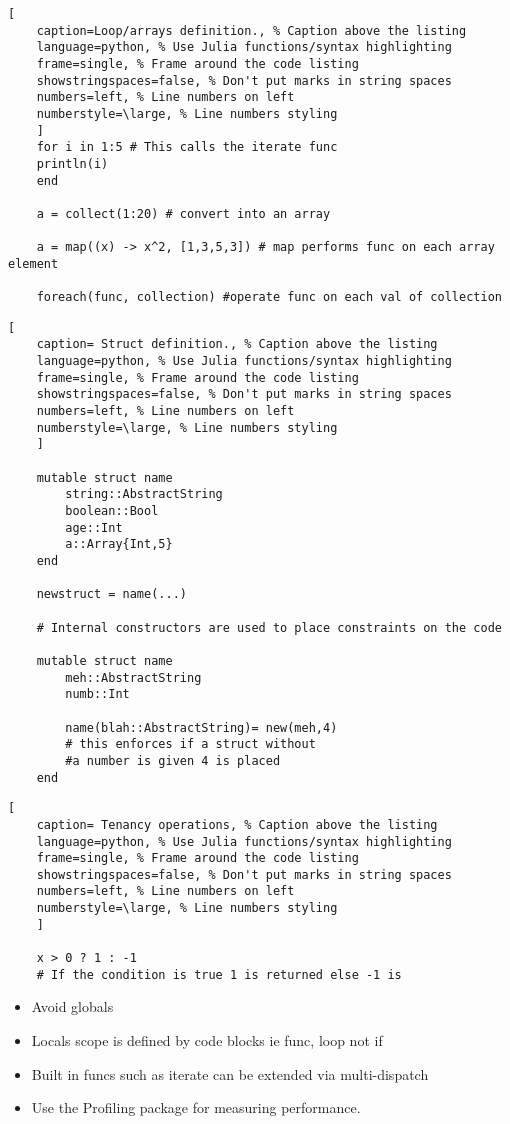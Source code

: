 \documentclass[11pt]{scrartcl} %
\begin{document}
\begin{lstlisting}[
	caption=Loop/arrays definition., % Caption above the listing
	language=python, % Use Julia functions/syntax highlighting
	frame=single, % Frame around the code listing
	showstringspaces=false, % Don't put marks in string spaces
	numbers=left, % Line numbers on left
	numberstyle=\large, % Line numbers styling
	]	
	for i in 1:5 # This calls the iterate func
	println(i)
	end

	a = collect(1:20) # convert into an array

	a = map((x) -> x^2, [1,3,5,3]) # map performs func on each array element

	foreach(func, collection) #operate func on each val of collection

\end{lstlisting}

\begin{lstlisting}[
	caption= Struct definition., % Caption above the listing
	language=python, % Use Julia functions/syntax highlighting
	frame=single, % Frame around the code listing
	showstringspaces=false, % Don't put marks in string spaces
	numbers=left, % Line numbers on left
	numberstyle=\large, % Line numbers styling
	]	
	
	mutable struct name 
		string::AbstractString
		boolean::Bool 
		age::Int
		a::Array{Int,5}
	end

	newstruct = name(...)

	# Internal constructors are used to place constraints on the code

	mutable struct name
		meh::AbstractString
		numb::Int

		name(blah::AbstractString)= new(meh,4) 
		# this enforces if a struct without 
		#a number is given 4 is placed
	end

\end{lstlisting}

\begin{lstlisting}[
	caption= Tenancy operations, % Caption above the listing
	language=python, % Use Julia functions/syntax highlighting
	frame=single, % Frame around the code listing
	showstringspaces=false, % Don't put marks in string spaces
	numbers=left, % Line numbers on left
	numberstyle=\large, % Line numbers styling
	]

	x > 0 ? 1 : -1 
	# If the condition is true 1 is returned else -1 is

\end{lstlisting}

\begin{itemize}
	\item Avoid globals
	\item Locals scope is defined by code blocks ie func, loop not if
	\item Built in funcs such as iterate can be extended via multi-dispatch
	\item Use the Profiling package for measuring performance.
\end{itemize}
\end{document}
